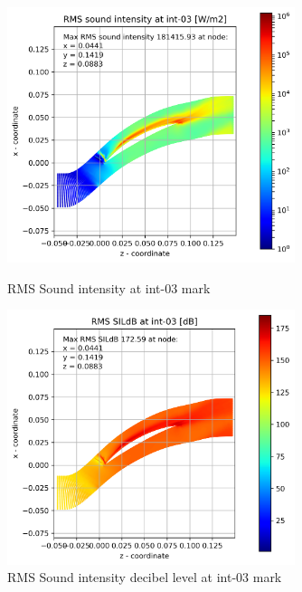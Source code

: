 \begin{figure}[ht]
  \centering
  \includegraphics[width=0.75\textwidth]{Figures/int-03-rms-sil.png}
  \caption{RMS Sound intensity at int-03 mark} \label{int-03-rms-sil}
  
  \vspace*{\floatsep}%

  \includegraphics[width=0.75\textwidth]{Figures/int-03-rms-sildb.png}
  \caption{RMS Sound intensity decibel level at int-03 mark} \label{int-03-rms-sildb}
\end{figure}


